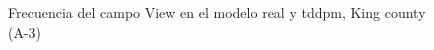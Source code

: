 \begin{figure}[H]
    \centering
    
    \caption{Frecuencia del campo View en el modelo real y tddpm, King county (A-3)}
    \label{frecuency-tddpm-view}
\end{figure}